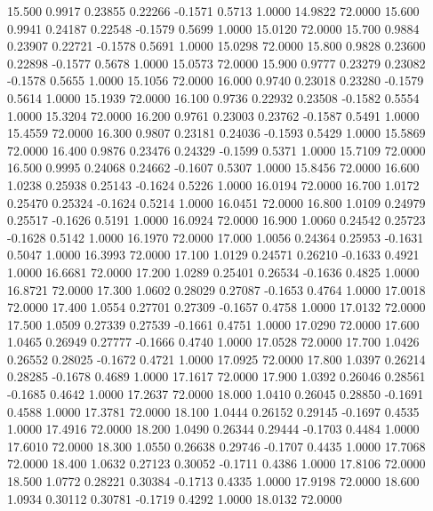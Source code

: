   15.500   0.9917   0.23855   0.22266  -0.1571   0.5713   1.0000  14.9822  72.0000
  15.600   0.9941   0.24187   0.22548  -0.1579   0.5699   1.0000  15.0120  72.0000
  15.700   0.9884   0.23907   0.22721  -0.1578   0.5691   1.0000  15.0298  72.0000
  15.800   0.9828   0.23600   0.22898  -0.1577   0.5678   1.0000  15.0573  72.0000
  15.900   0.9777   0.23279   0.23082  -0.1578   0.5655   1.0000  15.1056  72.0000
  16.000   0.9740   0.23018   0.23280  -0.1579   0.5614   1.0000  15.1939  72.0000
  16.100   0.9736   0.22932   0.23508  -0.1582   0.5554   1.0000  15.3204  72.0000
  16.200   0.9761   0.23003   0.23762  -0.1587   0.5491   1.0000  15.4559  72.0000
  16.300   0.9807   0.23181   0.24036  -0.1593   0.5429   1.0000  15.5869  72.0000
  16.400   0.9876   0.23476   0.24329  -0.1599   0.5371   1.0000  15.7109  72.0000
  16.500   0.9995   0.24068   0.24662  -0.1607   0.5307   1.0000  15.8456  72.0000
  16.600   1.0238   0.25938   0.25143  -0.1624   0.5226   1.0000  16.0194  72.0000
  16.700   1.0172   0.25470   0.25324  -0.1624   0.5214   1.0000  16.0451  72.0000
  16.800   1.0109   0.24979   0.25517  -0.1626   0.5191   1.0000  16.0924  72.0000
  16.900   1.0060   0.24542   0.25723  -0.1628   0.5142   1.0000  16.1970  72.0000
  17.000   1.0056   0.24364   0.25953  -0.1631   0.5047   1.0000  16.3993  72.0000
  17.100   1.0129   0.24571   0.26210  -0.1633   0.4921   1.0000  16.6681  72.0000
  17.200   1.0289   0.25401   0.26534  -0.1636   0.4825   1.0000  16.8721  72.0000
  17.300   1.0602   0.28029   0.27087  -0.1653   0.4764   1.0000  17.0018  72.0000
  17.400   1.0554   0.27701   0.27309  -0.1657   0.4758   1.0000  17.0132  72.0000
  17.500   1.0509   0.27339   0.27539  -0.1661   0.4751   1.0000  17.0290  72.0000
  17.600   1.0465   0.26949   0.27777  -0.1666   0.4740   1.0000  17.0528  72.0000
  17.700   1.0426   0.26552   0.28025  -0.1672   0.4721   1.0000  17.0925  72.0000
  17.800   1.0397   0.26214   0.28285  -0.1678   0.4689   1.0000  17.1617  72.0000
  17.900   1.0392   0.26046   0.28561  -0.1685   0.4642   1.0000  17.2637  72.0000
  18.000   1.0410   0.26045   0.28850  -0.1691   0.4588   1.0000  17.3781  72.0000
  18.100   1.0444   0.26152   0.29145  -0.1697   0.4535   1.0000  17.4916  72.0000
  18.200   1.0490   0.26344   0.29444  -0.1703   0.4484   1.0000  17.6010  72.0000
  18.300   1.0550   0.26638   0.29746  -0.1707   0.4435   1.0000  17.7068  72.0000
  18.400   1.0632   0.27123   0.30052  -0.1711   0.4386   1.0000  17.8106  72.0000
  18.500   1.0772   0.28221   0.30384  -0.1713   0.4335   1.0000  17.9198  72.0000
  18.600   1.0934   0.30112   0.30781  -0.1719   0.4292   1.0000  18.0132  72.0000
